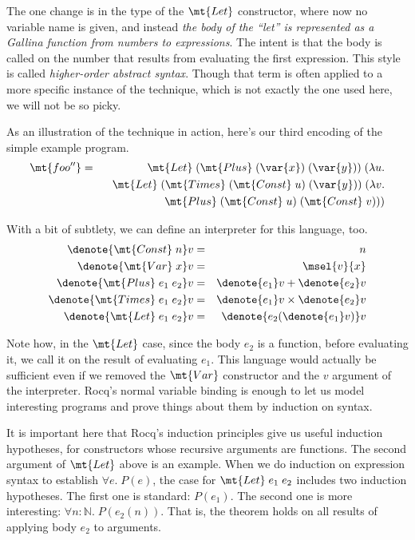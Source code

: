 \documentclass{amsbook}
\theoremstyle{definition}
\theoremstyle{remark}
\numberwithin{section}{chapter}
\numberwithin{equation}{chapter}
\begin{document}
The one change is in the type of the $\mt{Let}$ constructor, where now no variable name is given, and instead \emph{the body of the ``let'' is represented as a Gallina function from numbers to expressions}.
The intent is that the body is called on the number that results from evaluating the first expression.
This style is called \emph{higher-order abstract syntax}.
Though that term is often applied to a more specific instance of the technique, which is not exactly the one used here, we will not be so picky.

As an illustration of the technique in action, here's our third encoding of the simple example program.
\begin{eqnarray*}
  \mt{foo''} &=& \mt{Let} \; (\mt{Plus} \; (\var{x}) \; (\var{y})) \; (\lambda u. \\
  && \hspace{.1in} \mt{Let} \; (\mt{Times} \; (\mt{Const} \; u) \; (\var{y})) \; (\lambda v. \\
  && \hspace{.2in} \mt{Plus} \; (\mt{Const} \; u) \; (\mt{Const} \; v)))
\end{eqnarray*}

With a bit of subtlety, we can define an interpreter for this language, too.
\begin{eqnarray*}
  \denote{\mt{Const} \; n}v &=& n \\
  \denote{\mt{Var} \; x}v &=& \msel{v}{x} \\
  \denote{\mt{Plus} \; e_1 \; e_2}v &=& \denote{e_1}v + \denote{e_2}v \\
  \denote{\mt{Times} \; e_1 \; e_2}v &=& \denote{e_1}v \times \denote{e_2}v \\
  \denote{\mt{Let} \; e_1 \; e_2}v &=& \denote{e_2(\denote{e_1}v)}v
\end{eqnarray*}

Note how, in the $\mt{Let}$ case, since the body $e_2$ is a function, before evaluating it, we call it on the result of evaluating $e_1$.
This language would actually be sufficient even if we removed the $\mt{Var}$ constructor and the $v$ argument of the interpreter.
Rocq's normal variable binding is enough to let us model interesting programs and prove things about them by induction on syntax.

It is important here that Rocq's induction principles give us useful induction hypotheses, for constructors whose recursive arguments are functions.
The second argument of $\mt{Let}$ above is an example.
When we do induction on expression syntax to establish $\forall e. \; P(e)$, the case for $\mt{Let} \; e_1 \; e_2$ includes two induction hypotheses.
The first one is standard: $P(e_1)$.
The second one is more interesting: $\forall n : \mathbb N. \; P(e_2(n))$.
That is, the theorem holds on all results of applying body $e_2$ to arguments.
\end{document}
